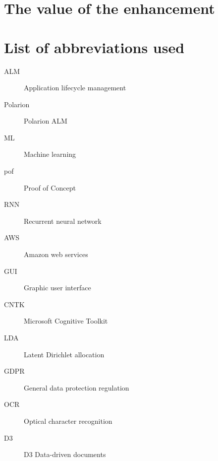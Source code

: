 \documentclass[thesis=M,english]{FITthesis}[2012/06/26]
\begin{document}
\chapter{The value of the enhancement}

\begin{conclusion}
\end{conclusion}




\appendix

\chapter{List of abbreviations used}

\printglossaries

\begin{description}
	\item[ALM] Application lifecycle management
	\item[Polarion] Polarion ALM
	\item[ML] Machine learning 
	\item[pof] Proof of Concept
	\item[RNN] Recurrent neural network
	\item[AWS] Amazon web services
	\item[GUI] Graphic user interface
	\item[CNTK] Microsoft Cognitive Toolkit
	\item[LDA] Latent Dirichlet allocation
	\item[GDPR] General data protection regulation
	\item[OCR] Optical character recognition
	\item[D3] D3 Data-driven documents
\end{description}
\end{document}
